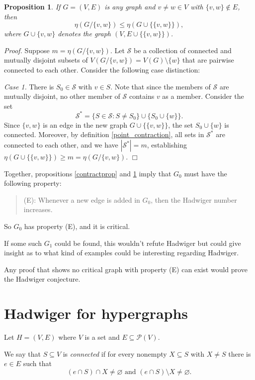 \documentclass[12pt, a4paper]{amsart}
\newtheorem{proposition}[lemma]{\bf Proposition}
\let\cal\mathcal
\let\emptyset\varnothing
\begin{document}
\begin{proposition} \label{edgeprop}
If $G=(V,E)$ is any graph and $v\neq w\in V$ with $\{v,w\} \notin E$,
	then $$\eta(G/\{v,w\}) \leq \eta(G \cup \big\{\{v,w\}\big\}),$$
	where $G\cup \{v,w\}$ denotes the graph $(V, E\cup\big\{\{v,w\}\big\})$.
\end{proposition}
{\em Proof.} Suppose $m=\eta(G/\{v,w\})$. Let ${\cal S}$ be a collection
of connected and mutually disjoint subsets of $V(G/\{v,w\}) = V(G) \setminus \{w\}$
that are pairwise connected to each other. Consider the following case distinction:

{\em Case 1.} There is $S_0\in {\cal S}$ with $v\in S$. Note that since the
members of ${\cal S}$ are mutually disjoint, no other member of ${\cal S}$ contains
$v$ as a member. Consider the set $${\cal S}^* = \{S\in {\cal S}: S\neq S_0\}
\cup\big\{S_0\cup \{w\}\big\}.$$
Since $\{v,w\}$ is an edge in the new graph $G\cup\big\{\{v,w\}\big\}$, the set
$S_0\cup \{w\}$ is connected. Moreover, by definition \ref{point_contraction},
all sets in ${\cal S}^*$ are connected to each other, and we have $|{\cal S}^*| = m$,
establishing $\eta(G\cup\big\{\{v,w\}\big\}) \geq m = \eta(G/\{v,w\})$.
\hfill{$\Box$}

Together, propositions \ref{contractprop} and \ref{edgeprop}
imply that $G_0$ must have the following property:
\begin{quote}
	(E): Whenever a new edge is added in $G_0$, then the
	Hadwiger number increases.
\end{quote}

So $G_0$ has property (E), and it is critical. 

If some such $G_1$ could be found, this wouldn't refute Hadwiger
but could give insight as to what kind of examples could be interesting
regarding Hadwiger.

Any proof that shows no critical graph with property (E) can exist
would prove the Hadwiger conjecture.
\section{Hadwiger for hypergraphs}

Let $H=(V,E)$ where $V$ is a set and $E\subseteq {\cal P}(V)$. 

We say that $S\subseteq V$ is {\em connected} if for every nonempty 
$X\subseteq S$ with $X\neq S$ there is $e\in E$ such that 
$$(e\cap S) \cap X \neq \emptyset\text{ and }
(e\cap S)\setminus X\neq \emptyset.$$
\end{document}
